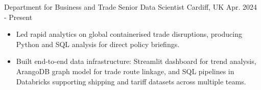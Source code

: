 

\begin{cventries}

  \cventry
    {Department for Business and Trade} %
    {Senior Data Scientist} %
    {Cardiff, UK} %
    {Apr. 2024 - Present} %
    {\renewcommand{\labelitemii}{\bullet}
      \begin{cvitems} %
        \item[] {\jobstyle{} 
            \begin{itemize} %
                \item {Led rapid analytics on global containerised trade disruptions, producing Python and SQL analysis for direct policy briefings.}
                \item {Built end-to-end data infrastructure: Streamlit dashboard for trend analysis, ArangoDB graph model for trade route linkage, and SQL pipelines in Databricks supporting shipping and tariff datasets across multiple teams.}
              \end{itemize}}  
      \end{cvitems}
    }    


\end{cventries}

